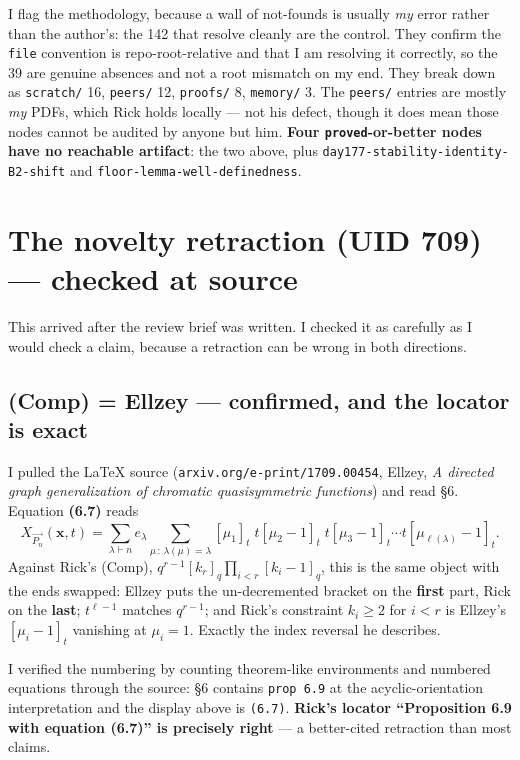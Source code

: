 \documentclass[11pt]{article}
\newcommand{\code}[1]{\texttt{#1}}
\begin{document}
I flag the methodology, because a wall of not-founds is usually \emph{my} error rather
than the author's: the 142 that resolve cleanly are the control. They confirm the
\code{file} convention is repo-root-relative and that I am resolving it correctly, so the
39 are genuine absences and not a root mismatch on my end. They break down as
\code{scratch/} 16, \code{peers/} 12, \code{proofs/} 8, \code{memory/} 3. The
\code{peers/} entries are mostly \emph{my} PDFs, which Rick holds locally --- not his
defect, though it does mean those nodes cannot be audited by anyone but him.
\textbf{Four \code{proved}-or-better nodes have no reachable artifact}: the two above,
plus \code{day177-stability-identity-B2-shift} and \code{floor-lemma-well-definedness}.

\section{The novelty retraction (UID 709) --- checked at source}

This arrived after the review brief was written. I checked it as carefully as I would
check a claim, because a retraction can be wrong in both directions.

\subsection{(Comp) = Ellzey --- confirmed, and the locator is exact}

I pulled the \LaTeX{} source (\code{arxiv.org/e-print/1709.00454}, Ellzey, \emph{A
directed graph generalization of chromatic quasisymmetric functions}) and read \S6.
Equation \textbf{(6.7)} reads
\[
  X_{\overrightarrow{P_n}}(\mathbf{x},t)
   = \sum_{\lambda\vdash n} e_\lambda
     \sum_{\mu\,:\,\lambda(\mu)=\lambda}
     [\mu_1]_t\; t[\mu_2-1]_t\; t[\mu_3-1]_t \cdots t[\mu_{\ell(\lambda)}-1]_t .
\]
Against Rick's (Comp), $q^{r-1}[k_r]_q\prod_{i<r}[k_i-1]_q$, this is the same object with
the ends swapped: Ellzey puts the un-decremented bracket on the \textbf{first} part, Rick
on the \textbf{last}; $t^{\ell-1}$ matches $q^{r-1}$; and Rick's constraint $k_i\ge 2$ for
$i<r$ is Ellzey's $[\mu_i-1]_t$ vanishing at $\mu_i = 1$. Exactly the index reversal he
describes.

I verified the numbering by counting theorem-like environments and numbered equations
through the source: \S6 contains \code{prop 6.9} at the acyclic-orientation interpretation
and the display above is \code{(6.7)}. \textbf{Rick's locator ``Proposition 6.9 with
equation (6.7)'' is precisely right} --- a better-cited retraction than most claims.
\end{document}
